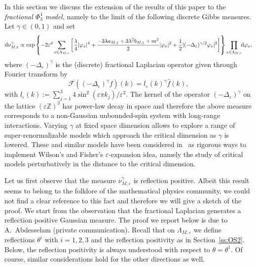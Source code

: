 \documentclass[a4paper,11pt]{article}
\newcommand{\mathd}{\mathrm{d}}
\numberwithin{equation}{section}
\begin{document}
In this section we discuss the extension of the results of this  paper to the \emph{fractional $\Phi^4_3$ model}, namely to the limit  of the following discrete Gibbs measures. Let $\gamma \in (0, 1)$ and set
{\small{\begin{equation}
  \mathd \nu_{M, \varepsilon}^{\gamma} \propto \exp \left\{ - 2 \varepsilon^d 
  \sum_{x \in \Lambda_{M, \varepsilon}} \left[ \frac{\lambda}{4} | \varphi_x
  |^4 + \frac{- 3 \lambda a_{M, \varepsilon} + 3 \lambda^2 b_{M, \varepsilon}
  + m^2}{2} | \varphi_x |^2 + \frac{1}{2} | (- \Delta_{\varepsilon})^{\gamma /
  2} \varphi_x |^2 \right] \right\}  \prod_{x \in \Lambda_{M, \varepsilon}}
  \hspace{-0.17em} \hspace{-0.17em} \mathd \varphi_x,
  \label{eq:fractional-gibbs}
\end{equation}}}
where $(- \Delta_{\varepsilon})^{\gamma}$ is the (discrete) fractional
Laplacian operator given through Fourier transform by
\[ \mathcal{F} ((- \Delta_{\varepsilon})^{\gamma} f) (k) = l_{\varepsilon}
   (k)^{\gamma}  \hat{f} (k), \]
with $l_{\varepsilon} (k) := \sum_{j = 1}^3 4 \sin^2 (\varepsilon \pi k_j) /
\varepsilon^2$. The kernel of the operator $(- \Delta_{\varepsilon})^{\gamma}$ on the lattice $(\varepsilon \mathbb{Z})^3$ has power-law decay in  space and therefore the above measure corresponds to a non-Gaussian unbounded-spin system with long-range interactions. Varying $\gamma$ at fixed space dimension allows to explore a range of super-renormalizable models which approach the critical dimension  as $\gamma$ is lowered. These and similar models have been considered in~\cite{brydges_non_gaussian_1998, MR2004988, MR2350436, slade_critical_2018, MR3874867} as rigorous ways to implement Wilson's and Fisher's $\varepsilon$-expansion idea, namely the study of critical models perturbatively in the distance to the critical dimension.

%
Let us first observe  that the measure $\nu_{M, \varepsilon}^{\gamma}$ is reflection positive. Albeit this result
seems to belong to the folklore of the mathematical physics community, we could
not find a clear reference to this fact and therefore we will give a sketch  of the proof. We
start from the observation that the fractional Laplacian generates a
reflection positive Gaussian measure. The proof we report below is due to
A.~Abdesselam (private communication). Recall that on $\Lambda_{M,\varepsilon}$ we define reflections $\theta^i$ with  $i=1,2,3$ and the reflection positivity as in Section~\ref{ss:OS2}. 
Below, the reflection positivity is always understood with respect to $\theta=\theta^1$. Of course,  similar considerations hold for the other directions as well.
\end{document}
